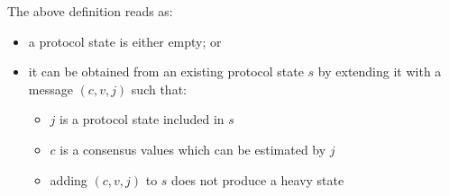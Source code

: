 The above definition reads as:
\begin{itemize}
    \item a protocol state is either empty; or
    \item it can be obtained from an existing protocol state $s$ by extending
        it with a message $(c, v, j)$ such that:
        \begin{itemize}
            \item $j$ is a protocol state included in $s$
            \item $c$ is a consensus values which can be estimated by $j$
            \item adding $(c,v,j)$ to $s$ does not produce a heavy state
        \end{itemize}
\end{itemize}

